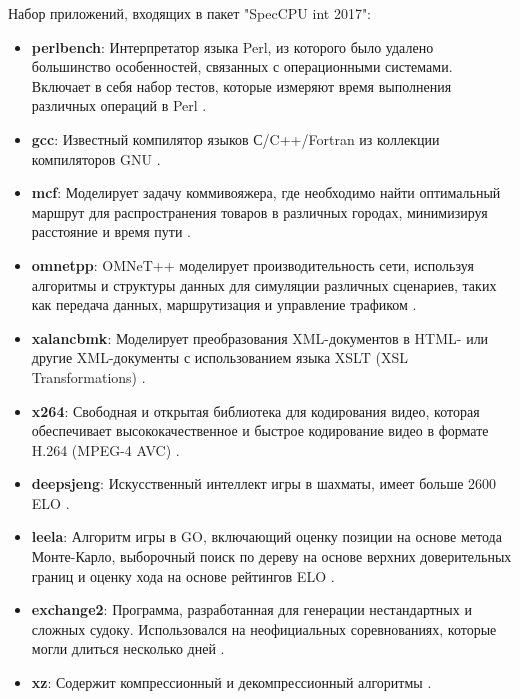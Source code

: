 Набор приложений, входящих в пакет "SpecCPU int 2017"\phantom{}:
\begin{itemize}
		\item  \textbf{perlbench}:  Интерпретатор языка Perl, из которого было удалено большинство особенностей, связанных с операционными системами. Включает в себя набор тестов, которые измеряют время выполнения различных операций в Perl \cite{siever1998perl}.
		\item  \textbf{gcc}: Известный компилятор языков С/C++/Fortran из коллекции компиляторов GNU \cite{gough2004introduction}. 
		\item  \textbf{mcf}: Моделирует задачу коммивояжера, где необходимо найти оптимальный маршрут для распространения товаров в различных городах, минимизируя расстояние и время пути \cite{lobel1999solving}.
		\item  \textbf{omnetpp}: OMNeT++ моделирует производительность  сети, используя алгоритмы и структуры данных для симуляции различных сценариев, таких как передача данных, маршрутизация и управление трафиком \cite{varga2019practical}.
		\item  \textbf{xalancbmk}: Моделирует преобразования XML-документов в HTML- или другие XML-документы с использованием языка XSLT (XSL Transformations) \cite{euzenat2002xml}.
		\item  \textbf{x264}: Свободная и открытая библиотека для кодирования видео, которая обеспечивает высококачественное и быстрое кодирование видео в формате H.264 (MPEG-4 AVC) \cite{merritt2006x264}.
		\item  \textbf{deepsjeng}: Искусственный интеллект игры в шахматы, имеет больше 2600 ELO  \cite{sandin2021ssdf}.
		\item  \textbf{leela}: Алгоритм игры в GO, включающий оценку позиции на основе метода Монте-Карло, выборочный поиск по дереву на основе верхних доверительных границ и оценку хода на основе рейтингов ELO \cite{choi2022does} .
		\item  \textbf{exchange2}: Программа, разработанная для генерации нестандартных и сложных судоку. Использовался на неофициальных соревнованиях, которые могли длиться несколько дней \cite{10.1145/1124708.1124709}. 
		\item  \textbf{xz}: Содержит компрессионный и декомпрессионный алгоритмы \cite{koranne2011compression}. 
\end{itemize}


